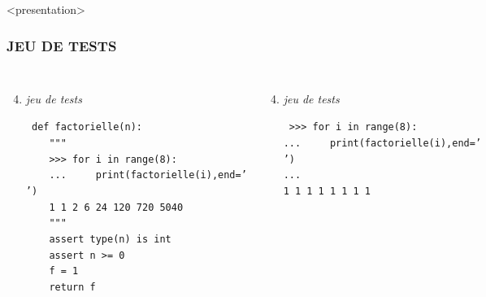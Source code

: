 

\begin{frame}<presentation>
\frametitle{\uppercase{Jeu de tests}}
\begin{columns}[T]
\column{5.25cm}
\begin{enumerate}\setcounter{enumi}{3}
\item {\em jeu de tests}
\begin{minipage}[t]{5.5cm}\scriptsize\tt
def factorielle(n):\\
\mbox{}\ \ \ \ \alert{"""}\\
\mbox{}\ \ \ \ \alert{>>> for i in range(8):}\\
\mbox{}\ \ \ \ \alert{...\ \ \ \ \ print(factorielle(i),end=' ')}\\
\mbox{}\ \ \ \ \alert{1 1 2 6 24 120 720 5040}\\
\mbox{}\ \ \ \ \alert{"""}\\
\mbox{}\ \ \ \ assert type(n) is int\\
\mbox{}\ \ \ \ assert n >= 0\\
\mbox{}\ \ \ \ f = 1\\
\mbox{}\ \ \ \ return f
\end{minipage}
\end{enumerate}

\column{5.25cm}
\begin{enumerate}\setcounter{enumi}{3}
\item {\em jeu de tests}
\begin{minipage}[t]{5cm}\scriptsize\tt
{>}{>}> for i in range(8):\\
...\ \ \ \ \ print(factorielle(i),end=' ')\\
...\\
1 1 1 1 1 1 1 1
\end{minipage}
\end{enumerate} 

\end{columns}

\end{frame}
